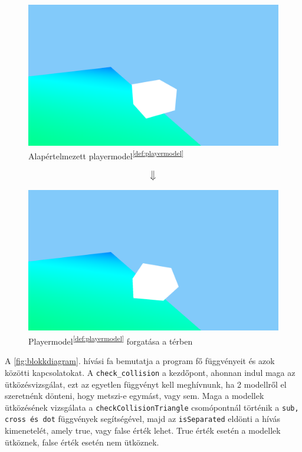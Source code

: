 \newpage

\begin{figure}[h]
	\centering
	\includegraphics[width=13truecm, height=7truecm]{images/modell_4.3.2.1.png}
	\caption{Alapértelmezett playermodel\textsuperscript{\ref{def:playermodel}}}
	\label{fig:forgatas_1}
\end{figure}
$$\big\Downarrow$$
\begin{figure}[h]
	\centering
	\includegraphics[width=13truecm, height=7truecm]{images/modell_4.3.2.3.png}
	\caption{Playermodel\textsuperscript{\ref{def:playermodel}} forgatása a térben}
	\label{fig:forgatas_2}
\end{figure}

\newpage
{}

A \ref{fig:blokkdiagram}. hívási fa bemutatja a program fő függvényeit és azok közötti kapcsolatokat. A \texttt{check\_collision} a kezdőpont, ahonnan indul maga az ütközésvizsgálat, ezt az egyetlen függvényt kell meghívnunk, ha 2 modellről el szeretnénk dönteni, hogy metszi-e egymást, vagy sem. Maga a modellek ütközésének vizsgálata a \texttt{checkCollisionTriangle} csomópontnál történik a \texttt{sub, cross és dot} függvények segítségével, majd az \texttt{isSeparated} eldönti a hívás kimenetelét, amely true, vagy false érték lehet. True érték esetén a modellek ütköznek, false érték esetén nem ütköznek.


